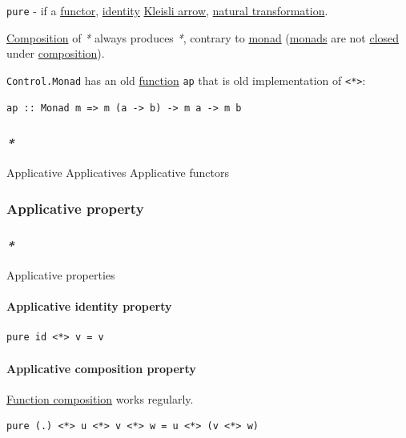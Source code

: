 \documentclass[a4paper,14pt,oneside]{book}
\begin{document}
\texttt{pure} - if a \hyperref[org878310f]{functor}, \hyperref[org70f87e4]{identity} \hyperref[org7359778]{Kleisli arrow}, \hyperref[org35cab4f]{natural transformation}.

\hyperref[org2721976]{Composition} of \emph{*} always produces \emph{*}, contrary to \hyperref[org5b6d1e0]{monad} (\hyperref[org3fa5862]{monads} are not \hyperref[orgbb2dba2]{closed} under \hyperref[org2721976]{composition}).

\texttt{Control.Monad} has an old \hyperref[org50bbe06]{function} \texttt{ap} that is old implementation of \texttt{<*>}:
\begin{verbatim}
ap :: Monad m => m (a -> b) -> m a -> m b
\end{verbatim}

\subsubsection{\emph{*}}
\label{sec:orgeaa1627}

\label{orge473e43}Applicative
\label{org38373d1}Applicatives
\label{org1a35802}Applicative functors

\subsubsection{\label{org6c5abea}Applicative property}
\label{sec:org521160f}

\subsubsection{\emph{*}}
\label{sec:orgc56d756}
\label{org42957d6}Applicative properties

\paragraph{\label{orgd05282e}Applicative identity property}
\label{sec:org9200eca}
\begin{verbatim}
pure id <*> v = v
\end{verbatim}

\paragraph{\label{org820818b}Applicative composition property}
\label{sec:orgef3025c}
\hyperref[orgdc6e2a4]{Function composition} works regularly.
\begin{verbatim}
pure (.) <*> u <*> v <*> w = u <*> (v <*> w)
\end{verbatim}
\end{document}
